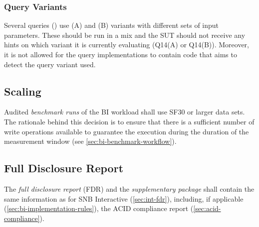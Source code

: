 \subsubsection{Query Variants}
\label{sec:bi-query-variants}

Several queries (\eg {}) use (A) and (B) variants with different sets of input parameters.
These should be run in a mix and the SUT should not receive any hints on which variant it is currently evaluating (\eg Q14(A) or Q14(B)).
Moreover, it is not allowed for the query implementations to contain code that aims to detect the query variant used.

\subsection{Scaling}
\label{sec:bi-scaling}

Audited \emph{benchmark runs} of the BI workload shall use SF30 or larger data sets.
The rationale behind this decision is to ensure that there is a sufficient number of write operations available to guarantee the execution during the duration of the measurement window (see \autoref{sec:bi-benchmark-workflow}).

\subsection{Full Disclosure Report}
\label{sec:bi-fdr}

The \emph{full disclosure report} (FDR) and the \emph{supplementary package} shall contain
the same information as for SNB Interactive (\autoref{sec:int-fdr}),
including, if applicable (\autoref{sec:bi-implementation-rules}), the ACID compliance report (\autoref{sec:acid-compliance}).
